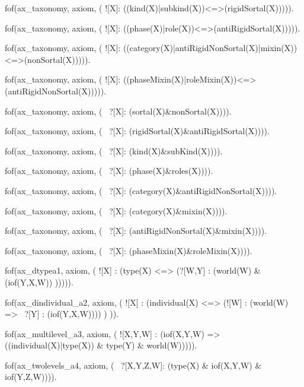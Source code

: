 fof(ax_taxonomy, axiom, (
![X]: ((kind(X)|subkind(X))<=>(rigidSortal(X))))).

fof(ax_taxonomy, axiom, (
![X]: ((phase(X)|role(X))<=>(antiRigidSortal(X))))).

fof(ax_taxonomy, axiom, (
![X]: ((category(X)|antiRigidNonSortal(X)|mixin(X))<=>(nonSortal(X))))).

fof(ax_taxonomy, axiom, (
![X]: ((phaseMixin(X)|roleMixin(X))<=>(antiRigidNonSortal(X))))).



fof(ax_taxonomy, axiom, (
    ~?[X]: (sortal(X)&nonSortal(X)))).

fof(ax_taxonomy, axiom, (
    ~?[X]: (rigidSortal(X)&antiRigidSortal(X)))).

fof(ax_taxonomy, axiom, (
        ~?[X]: (kind(X)&subKind(X)))).

fof(ax_taxonomy, axiom, (
        ~?[X]: (phase(X)&roles(X)))).

fof(ax_taxonomy, axiom, (
        ~?[X]: (category(X)&antiRigidNonSortal(X)))).

fof(ax_taxonomy, axiom, (
        ~?[X]: (category(X)&mixin(X)))).

fof(ax_taxonomy, axiom, (
        ~?[X]: (antiRigidNonSortal(X)&mixin(X)))).

fof(ax_taxonomy, axiom, (
      ~?[X]: (phaseMixin(X)&roleMixin(X)))).



%
%

fof(ax_dtypea1, axiom, (
    ![X] : (type(X) <=> (?[W,Y] : (world(W) & (iof(Y,X,W))
    ))))).


fof(ax_dindividual_a2, axiom, (
        ![X] : (individual(X) <=> (![W] : (world(W) => ~?[Y] : (iof(Y,X,W)))) )
        )).

fof(ax_multilevel_a3, axiom, (
    ![X,Y,W] : (iof(X,Y,W) => ((individual(X)|type(X)) & type(Y) & world(W))))).

fof(ax_twolevels_a4, axiom, (
        ~?[X,Y,Z,W]: (type(X) & iof(X,Y,W) & iof(Y,Z,W)))).




